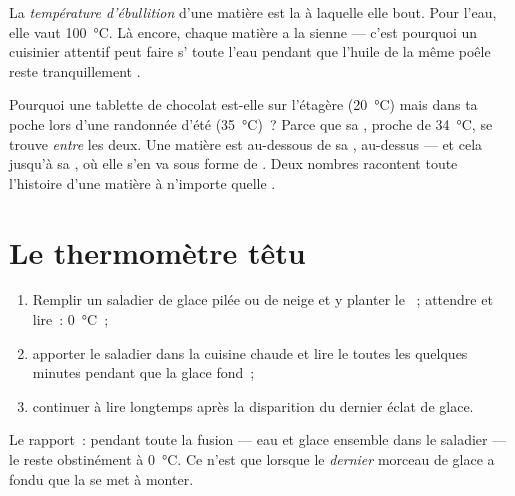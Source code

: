 \begin{definition}\label{def:g4:changes-of-state:boiling-point}
La \emph{température d'ébullition}
d'une matière est la  à laquelle elle bout. Pour l'eau,
elle vaut \qty{100}{\celsius}. Là encore, chaque matière a la
sienne --- c'est pourquoi un cuisinier attentif peut faire s'
toute l'eau pendant que l'huile de la même poêle reste
tranquillement .
\end{definition}

\begin{example}\label{ex:g4:changes-of-state:reading}
Pourquoi une tablette de chocolat est-elle  sur l'étagère
(\qty{20}{\celsius}) mais  dans ta poche lors d'une randonnée
d'été (\qty{35}{\celsius})~? Parce que sa ,
proche de \qty{34}{\celsius}, se trouve \emph{entre} les deux. Une
matière est  au-dessous de sa , 
au-dessus --- et cela jusqu'à sa , où elle
s'en va sous forme de . Deux nombres racontent toute l'histoire
d'une matière à n'importe quelle .
\end{example}

\section{Le thermomètre têtu}

\begin{method}\label{met:g4:changes-of-state:watch}
\begin{enumerate}
  \item Remplir un saladier de glace pilée ou de neige et y planter
        le ~; attendre et lire~: \qty{0}{\celsius}~;
  \item apporter le saladier dans la cuisine chaude et lire le
         toutes les quelques minutes pendant que la glace
        fond~;
  \item continuer à lire longtemps après la disparition du dernier
        éclat de glace.
\end{enumerate}
Le rapport~: pendant toute la fusion --- eau et glace ensemble dans
le saladier --- le  reste obstinément à \qty{0}{\celsius}.
Ce n'est que lorsque le \emph{dernier} morceau de glace a fondu que
la  se met à monter.
\end{method}

